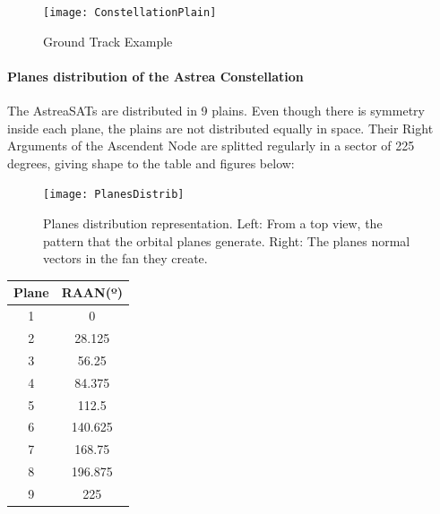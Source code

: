 \begin{figure}[h]
	\centering  
	\texttt{[image: ConstellationPlain]}
	\caption{Ground Track Example}	
\end{figure}

\newpage

\paragraph{Planes distribution of the Astrea Constellation \\}
The AstreaSATs are distributed in 9 plains. Even though there is symmetry inside each plane, the plains are not distributed equally in space. Their Right Arguments of the Ascendent Node are splitted regularly in a sector of 225 degrees, giving shape to the table and figures below:

\begin{figure}[h]
	\centering  
	\texttt{[image: PlanesDistrib]}
	\caption{Planes distribution representation. Left: From a top view, the pattern that the orbital planes generate. Right: The planes normal vectors in the fan they create.}	
\end{figure}

\centering
\begin{tabular}{|c|c|}
\hline
\textbf{Plane} & \textbf{RAAN(º)} \\ \hline 
1 & 0 \\ \hline
2 & 28.125 \\ \hline
3 & 56.25 \\ \hline
4 & 84.375 \\ \hline
5 & 112.5 \\ \hline
6 & 140.625 \\ \hline
7 & 168.75 \\ \hline
8 & 196.875 \\ \hline
9 & 225 \\ \hline
\end{tabular}